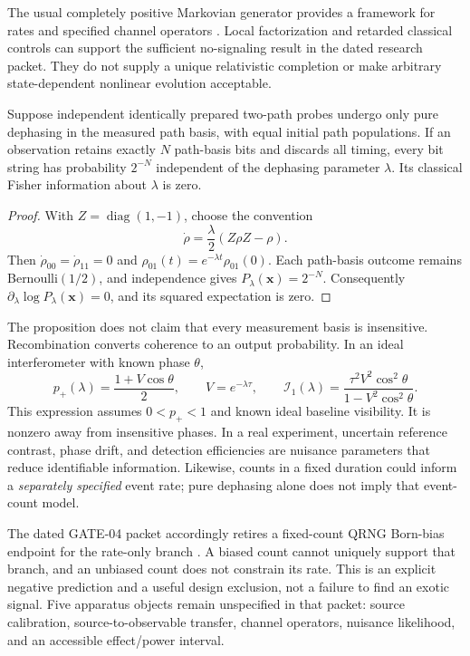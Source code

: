 The usual completely positive Markovian generator provides a framework for rates and specified channel operators \cite{lindblad}. Local factorization and retarded classical controls can support the sufficient no-signaling result in the dated research packet. They do not supply a unique relativistic completion or make arbitrary state-dependent nonlinear evolution acceptable.

\begin{proposition}
\label{prop:bits}
Suppose independent identically prepared two-path probes undergo only pure dephasing in the measured path basis, with equal initial path populations. If an observation retains exactly $N$ path-basis bits and discards all timing, every bit string has probability $2^{-N}$ independent of the dephasing parameter $\lambda$. Its classical Fisher information about $\lambda$ is zero.
\end{proposition}
\begin{proof}
With $Z=\operatorname{diag}(1,-1)$, choose the convention
\begin{equation}
 \dot\rho=\frac{\lambda}{2}(Z\rho Z-\rho).
\end{equation}
Then $\dot\rho_{00}=\dot\rho_{11}=0$ and $\rho_{01}(t)=e^{-\lambda t}\rho_{01}(0)$. Each path-basis outcome remains Bernoulli$(1/2)$, and independence gives $P_\lambda(\boldsymbol x)=2^{-N}$. Consequently $\partial_\lambda\log P_\lambda(\boldsymbol x)=0$, and its squared expectation is zero.
\end{proof}

The proposition does not claim that every measurement basis is insensitive. Recombination converts coherence to an output probability. In an ideal interferometer with known phase $\theta$,
\begin{equation}
 p_+(\lambda)=\frac{1+V\cos\theta}{2},\qquad
 V=e^{-\lambda\tau},\qquad
 \mathcal I_1(\lambda)=
 \frac{\tau^2V^2\cos^2\theta}{1-V^2\cos^2\theta}.
 \label{eq:fisher}
\end{equation}
This expression assumes $0<p_+<1$ and known ideal baseline visibility. It is nonzero away from insensitive phases. In a real experiment, uncertain reference contrast, phase drift, and detection efficiencies are nuisance parameters that reduce identifiable information. Likewise, counts in a fixed duration could inform a \emph{separately specified} event rate; pure dephasing alone does not imply that event-count model.

The dated GATE-04 packet accordingly retires a fixed-count QRNG Born-bias endpoint for the rate-only branch \cite{gate04}. A biased count cannot uniquely support that branch, and an unbiased count does not constrain its rate. This is an explicit negative prediction and a useful design exclusion, not a failure to find an exotic signal. Five apparatus objects remain unspecified in that packet: source calibration, source-to-observable transfer, channel operators, nuisance likelihood, and an accessible effect/power interval.

